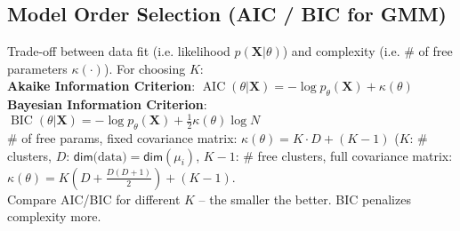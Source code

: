 \subsection*{Model Order Selection (AIC / BIC for GMM)}
Trade-off between data fit (i.e. likelihood $p(\mathbf{X} | \theta)$) and complexity (i.e. \# of free parameters $\kappa(\cdot)$). For choosing $K$:\\
\textbf{Akaike Information Criterion}: $\operatorname{AIC}(\theta | \mathbf{X}) = -\log p_\theta(\mathbf{X}) + \kappa(\theta)$\\
\textbf{Bayesian Information Criterion}: $\operatorname{BIC}(\theta | \mathbf{X}) = -\log p_\theta(\mathbf{X}) + \frac{1}{2} \kappa(\theta) \log N$\\
\# of free params, fixed covariance matrix: $\kappa(\theta) = K \cdot D + (K - 1)$ ($K$: \# clusters, $D$: $\mathsf{dim}\text{(data)}=\mathsf{dim}(\mu_i)$, $K-1$: \# free clusters, full covariance matrix: $\kappa(\theta) = K(D + \frac{D(D+1)}{2}) + (K - 1)$.\\
Compare AIC/BIC for different $K$ -- the smaller the better. BIC penalizes complexity more.
